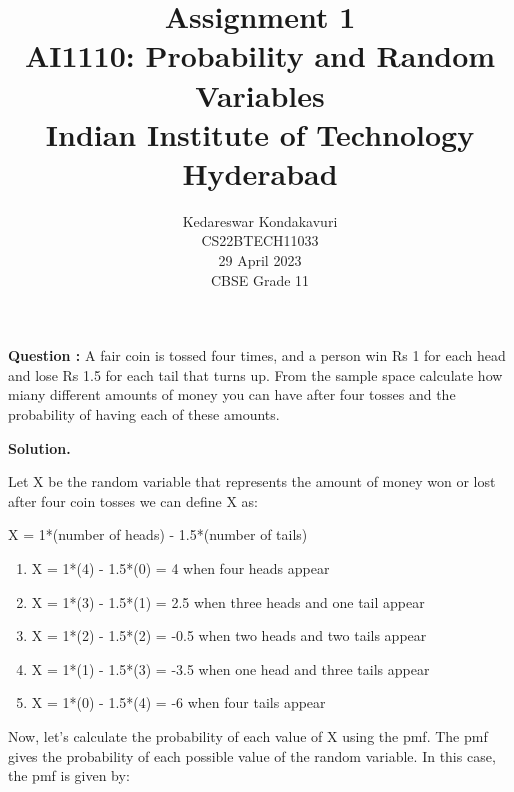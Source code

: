 \documentclass[journal,12pt,twocolumn]{IEEEtran}
\begin{document}
\let\vec\mathbf

\title{Assignment 1 \\ \Large AI1110: Probability and Random Variables \\ \large Indian Institute of Technology Hyderabad}
\author{Kedareswar Kondakavuri \\ \normalsize CS22BTECH11033 \\ \vspace*{20pt} \normalsize  29 April 2023 \\ \vspace*{20pt} \Large CBSE Grade 11}

	\maketitle
	
	\textbf{Question :}
	A fair coin is tossed four times, and a person win  Rs 1 for each head and lose
	Rs 1.5 for each tail that turns up.
	From the sample space calculate how miany different amounts of money you can
        have after four tosses and the probability of having each of these amounts.
       
	\textbf{Solution.}

        Let X be the random variable that represents the amount of money won or lost after four coin tosses we can define X as:

	X = 1*(number of heads) - 1.5*(number of tails)
	
        \begin{enumerate}[label=(\roman*)]
		
			\item X = 1*(4) - 1.5*(0) = 4   when four heads appear
			\item X = 1*(3) - 1.5*(1) = 2.5  when three heads and one tail appear
			\item X = 1*(2) - 1.5*(2) = -0.5 when two heads and two tails appear
			\item X = 1*(1) - 1.5*(3) = -3.5 when one head and three tails appear
			\item X = 1*(0) - 1.5*(4) = -6   when four tails appear


	\end{enumerate}

	Now, let's calculate the probability of each value of X using the pmf. The pmf gives the probability of each possible value of the random variable. In this case, the pmf is given by:
\end{document}
